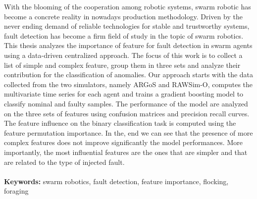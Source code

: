\documentclass[../../Thesis.tex]{subfiles}
\begin{document}
	With the blooming of the cooperation among robotic systems, swarm robotic has become a concrete reality in nowadays production methodology. Driven by the never ending demand of reliable technologies for stable and trustworthy systems, fault detection has become a firm field of study in the topic of swarm robotics. This thesis analyzes the importance of feature for fault detection in swarm agents using a data-driven centralized approach. The focus of this work is to collect a list of simple and complex feature, group them in three sets and analyze their contribution for the classification of anomalies. Our approach starts with the data collected from the two simulators, namely ARGoS and RAWSim-O, computes the multivariate time series for each agent and trains a gradient boosting model to classify nominal and faulty samples. The performance of the model are analyzed on the three sets of features using confusion matrices and precision recall curves. The feature influence on the binary classification task is computed using the feature permutation importance. In the, end we can see that the presence of more complex features does not improve significantly the model performances. More importantly, the most influential features are the ones that are simpler and that are related to the type of injected fault.
	\\
	\\
	\textbf{Keywords:} swarm robotics, fault detection, feature importance, flocking, foraging %
\end{document}
